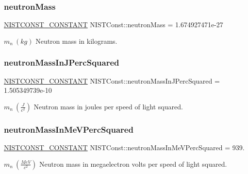 \subsubsection{\texorpdfstring{neutron\+Mass}{neutronMass}}
{\footnotesize\ttfamily \mbox{\hyperlink{_n_i_s_t_const_8hpp_a2b0fc1d7452373f816175dd86ce26729}{N\+I\+S\+T\+C\+O\+N\+S\+T\+\_\+\+C\+O\+N\+S\+T\+A\+NT}} N\+I\+S\+T\+Const\+::neutron\+Mass = 1.\+674927471e-\/27}

$m_n \ (kg)$ Neutron mass in kilograms. \mbox{\label{group___n_i_s_t_const-_neutron_ga15810e363506746df03012432e2a357d}} 
\subsubsection{\texorpdfstring{neutron\+Mass\+In\+J\+Perc\+Squared}{neutronMassInJPercSquared}}
{\footnotesize\ttfamily \mbox{\hyperlink{_n_i_s_t_const_8hpp_a2b0fc1d7452373f816175dd86ce26729}{N\+I\+S\+T\+C\+O\+N\+S\+T\+\_\+\+C\+O\+N\+S\+T\+A\+NT}} N\+I\+S\+T\+Const\+::neutron\+Mass\+In\+J\+Perc\+Squared = 1.\+505349739e-\/10}

$m_n \ (\frac{J}{c^2})$ Neutron mass in joules per speed of light squared. \mbox{\label{group___n_i_s_t_const-_neutron_ga297e6f2449995461e549326eaa3c8abc}} 
\subsubsection{\texorpdfstring{neutron\+Mass\+In\+Me\+V\+Perc\+Squared}{neutronMassInMeVPercSquared}}
{\footnotesize\ttfamily \mbox{\hyperlink{_n_i_s_t_const_8hpp_a2b0fc1d7452373f816175dd86ce26729}{N\+I\+S\+T\+C\+O\+N\+S\+T\+\_\+\+C\+O\+N\+S\+T\+A\+NT}} N\+I\+S\+T\+Const\+::neutron\+Mass\+In\+Me\+V\+Perc\+Squared = 939.}

$m_n \ (\frac{MeV}{c^2})$ Neutron mass in megaelectron volts per speed of light squared. \mbox{\label{group___n_i_s_t_const-_neutron_ga60a98d26ad8fd6d4cf7e95a9335fabd3}} 
